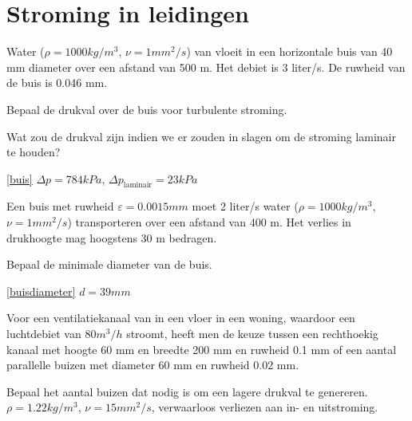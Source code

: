 \chapter{Stroming in leidingen}
\label{sec:Stroming in leidingen}
\begin{toepassing}
	\label{buis}
Water ($\rho=1000 \unit{kg/m^3}$, $\nu=1 \unit{mm^2/s}$) van vloeit in een horizontale buis van 40 mm diameter over een afstand van 500 m. Het debiet is 3 liter/s.  De ruwheid van de buis is 0.046 mm.
		
Bepaal de drukval over de buis voor turbulente stroming.
		
Wat zou de drukval zijn indien we er zouden in slagen om de stroming laminair te houden?
\end{toepassing}
\begin{antwoord}{\ref{buis}}
	$\Delta p = 784 \unit{kPa}$, $\Delta p_{\text{laminair}} = 23 \unit{kPa}$
\end{antwoord}
\begin{toepassing}[*]
	\label{buisdiameter}
Een buis met ruwheid $\varepsilon = 0.0015 \unit{mm}$ moet 2 liter/s water ($\rho=1000 \unit{kg/m^3}$, $\nu=1 \unit{mm^2/s}$) transporteren over een afstand van 400 m.  Het verlies in drukhoogte mag hoogstens 30 m bedragen.
		
Bepaal de minimale diameter van de buis.
\end{toepassing}
\begin{antwoord}{\ref{buisdiameter}}
	$d = 39 \unit{mm}$
\end{antwoord}
\begin{toepassing}
	\label{ventilatiekanaal}
Voor een ventilatiekanaal van in een vloer in een woning, waardoor een luchtdebiet van $80 \unit{m^3/h}$ stroomt, heeft men de keuze tussen een rechthoekig kanaal met hoogte 60 mm en breedte 200 mm en ruwheid 0.1 mm of een aantal parallelle buizen met diameter 60 mm en ruwheid 0.02 mm. 
		
Bepaal het aantal buizen dat nodig is om een lagere drukval te genereren. $\rho = 1.22 \unit{kg/m^3}$, $\nu = 15 \unit{mm^2/s}$, verwaarloos verliezen aan in- en uitstroming.
\end{toepassing}
